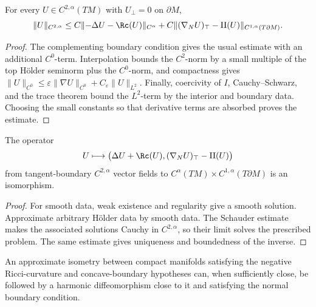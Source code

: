 \begin{lemma}
\label{lem:chow-iv-linearized-harmonic-boundary-schauder}
For every \(U\in C^{2,\alpha}(TM)\) with \(U_\perp=0\) on \(\partial M\),
\[
 \|U\|_{C^{2,\alpha}}
 \le C\|{-\Delta U-\Rc(U)}\|_{C^\alpha}
 +C\|(\nabla_NU)_{\top}-\mathrm{II}(U)\|_{C^{1,\alpha}(T\partial M)}.
\]
\end{lemma}
\begin{proof}
\sketch
The complementing boundary condition gives the usual estimate with an
additional \(C^0\)-term.  Interpolation bounds the \(C^2\)-norm by a small
multiple of the top Hölder seminorm plus the \(C^0\)-norm, and compactness gives
\(\|U\|_{C^0}\le\varepsilon\|\nabla U\|_{C^0}+C_\varepsilon\|U\|_{L^2}\).
Finally, coercivity of \(I\), Cauchy--Schwarz, and the trace theorem bound the
\(L^2\)-term by the interior and boundary data.  Choosing the small constants
so that derivative terms are absorbed proves the estimate.
\end{proof}

\begin{lemma}
\label{lem:chow-iv-linearized-harmonic-boundary-operator-invertible}
The operator
\[
 U\longmapsto
 \bigl(\Delta U+\Rc(U),(\nabla_NU)_{\top}-\mathrm{II}(U)\bigr)
\]
from tangent-boundary \(C^{2,\alpha}\) vector fields to
\(C^\alpha(TM)\times C^{1,\alpha}(T\partial M)\) is an isomorphism.
\end{lemma}
\begin{proof}
\sketch
For smooth data, weak existence and regularity give a smooth solution.  Approximate
arbitrary Hölder data by smooth data.  The Schauder estimate makes the associated
solutions Cauchy in \(C^{2,\alpha}\), so their limit solves the prescribed
problem.  The same estimate gives uniqueness and boundedness of the inverse.
\end{proof}

\begin{claim}
\label{clm:chow-iv-harmonic-diffeomorphism-near-approximate-isometry}
An approximate isometry between compact manifolds satisfying the negative
Ricci-curvature and concave-boundary hypotheses can, when sufficiently close,
be followed by a harmonic diffeomorphism close to it and satisfying the normal
boundary condition.
\end{claim}

